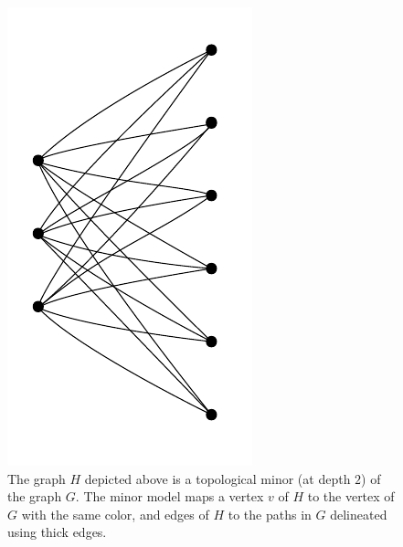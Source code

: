 \begin{figure}[h]
  \centering
    \includegraphics[scale=0.35,page=7]{pictures.pdf}
  \caption{The graph $H$ depicted above is a topological minor (at depth $2$) of the graph $G$. The minor model maps a vertex $v$ of $H$ to the vertex of $G$ with the same color, and edges of $H$ to the   paths in $G$ delineated using thick edges.} 
\end{figure}

